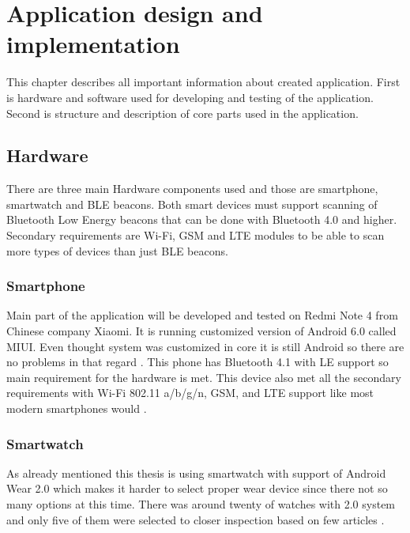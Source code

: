 \chapter{Application design and implementation}\label{sec:ApplicationDesingAndImplementation}
This chapter describes all important information about created application. First is hardware and software used for developing and testing of the application. Second is structure and description of core parts used in the application. 

\section{Hardware}\label{sec:Hardware}
There are three main Hardware components used and those are smartphone, smartwatch and BLE beacons. Both smart devices must support scanning of Bluetooth Low Energy beacons that can be done with Bluetooth 4.0 and higher. Secondary requirements are Wi-Fi, GSM and LTE modules to be able to scan more types of devices than just BLE beacons.  


\subsection{Smartphone}\label{subsec:Smartphone}
Main part of the application will be developed and tested on Redmi Note 4 from Chinese company Xiaomi. It is running customized version of Android 6.0 called MIUI. Even thought system was customized in core it is still Android so there are no problems in that regard  \cite{XRN4LTE}. This phone has Bluetooth 4.1 with LE support so main requirement for the hardware is met. This device also met all the secondary requirements with Wi-Fi 802.11 a/b/g/n, GSM, and LTE support like most modern smartphones would \cite{XRN4FPS}.

\subsection{Smartwatch}\label{subsec:Smartwatch}
As already mentioned this thesis is using smartwatch with support of Android Wear 2.0 which makes it harder to select proper wear device since there not so many options at this time. There was around twenty of watches with 2.0 system and only five of them were selected to closer inspection based on few articles \cite{BAWW, BAWW18, BAWW17}.

